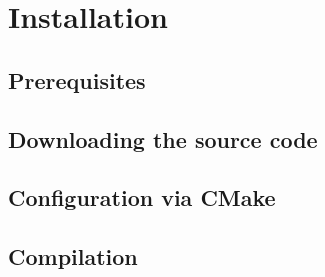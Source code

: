 \section{Installation}
\subsection{Prerequisites}
\subsection{Downloading the source code}
\subsection{Configuration via CMake}
\subsection{Compilation}
